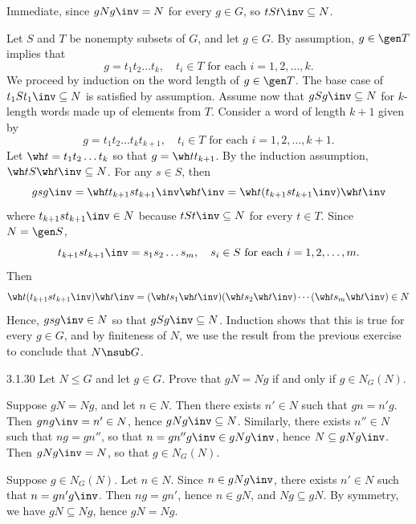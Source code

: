 \begin{soliff}
    \rightimp Immediate, since $gNg\inv = N$ for every $g \in G$, so $tSt\inv \subseteq N$.

    \leftimp Let $S$ and $T$ be nonempty subsets of $G$, and let $g \in G$.
	By assumption, $g \in \gen T$ implies that
    \[
    	g = t_1t_2 \dots t_k, \quad t_i \in T \text{ for each } i = 1, 2, \ldots, k.
    \]
    We proceed by induction on the word length of $g \in \gen T$.
	The base case of $t_1St_1\inv \subseteq N$ is satisfied by assumption.
	Assume now that $gSg\inv \subseteq N$ for $k$-length words made up of elements from $T$.
	Consider a word of length $k + 1$ given by 
    \[
    	g = t_1t_2 \ldots t_kt_{k + 1}, \quad t_i \in T \text{ for each } i = 1, 2, \ldots, k + 1.
    \]
    Let $\wh t = t_1t_2 \ldots t_k$ so that $g = \wh tt_{k + 1}$.
	By the induction assumption, $\wh tS\wh t\inv \subseteq N$.
	For any $s \in S$, then 
    \[
    	gsg\inv = \wh tt_{k + 1}st_{k + 1}\inv \wh t\inv = \wh t(t_{k + 1}st_{k + 1}\inv)\wh t\inv
    \]
    where $t_{k + 1}st_{k + 1}\inv \in N$ because $tSt\inv \subseteq N$ for every $t \in T$.
	Since $N = \gen S$,
    \[
    	t_{k + 1}st_{k + 1}\inv = s_1s_2 \ldots s_m, \quad s_i \in S \text{ for each } i = 1, 2, \ldots, m.
    \]
    Then
    \[
    	\wh t(t_{k + 1}st_{k + 1}\inv)\wh t\inv = (\wh ts_1\wh t\inv)(\wh ts_2 \wh t\inv) \cdots (\wh ts_m \wh t\inv) \in N
    \]
    Hence, $gsg\inv \in N$ so that $gSg\inv \subseteq N$.
	Induction shows that this is true for every $g \in G$, and by finiteness of $N$, we use the result from the previous exercise to conclude that $N \nsub G$.
\end{soliff}

\begin{exercise}{3.1.30}
    Let $N \leq G$ and let $g \in G$.
	Prove that $gN = Ng$ if and only if $g \in N_G(N)$.
\end{exercise}

\begin{soliff}
    \rightimp Suppose $gN = Ng$, and let $n \in N$.
    Then there exists $n' \in N$ such that $gn = n'g$.
    Then $gng\inv = n' \in N$, hence $gNg\inv \subseteq N$.
    Similarly, there exists $n'' \in N$ such that $ng = gn''$, so that $n = gn''g\inv \in gNg\inv$, hence $N \subseteq gNg\inv$.
    Then $gNg\inv = N$, so that $g \in N_G(N)$.

    \leftimp Suppose $g \in N_G(N)$.
	Let $n \in N$.
	Since $n \in gNg\inv$, there exists $n' \in N$ such that $n = gn'g\inv$.
	Then $ng = gn'$, hence $n \in gN$, and $Ng \subseteq gN$.
	By symmetry, we have $gN \subseteq Ng$, hence $gN = Ng$.
\end{soliff}

